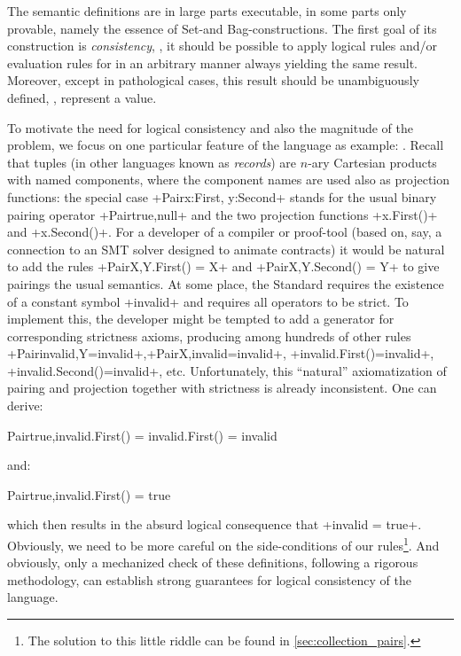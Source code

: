 The semantic definitions are in large parts executable, in some parts
only provable, namely the essence of Set-and Bag-constructions. The first goal
of its construction is \emph{consistency}, \ie, it should be possible
to apply logical rules and/or evaluation rules for \OCL in an
arbitrary manner always yielding the same result. Moreover, except in
pathological cases, this result should be unambiguously defined, \ie,
represent a value.

To motivate the need for logical consistency and also the magnitude of
the problem, we focus on one particular feature of the language as
example: . Recall that tuples (in other languages
known as \emph{records}) are $n$-ary Cartesian products with named
components, where the component names are used also as projection
functions: the special case %
\inlineocl+Pair{x:First, y:Second}+ stands for the usual binary
pairing operator \inlineocl+Pair{true,null}+ and the two projection
functions \inlineocl+x.First()+ and \inlineocl+x.Second()+. For a
developer of a compiler or proof-tool (based on, say, a connection to
an SMT solver designed to animate \OCL contracts) it would be natural
to add the rules \inlineocl+Pair{X,Y}.First() = X+ and
\inlineocl+Pair{X,Y}.Second() = Y+ to give pairings the usual
semantics. At some place, the \OCL Standard requires the existence of
a constant symbol \inlineocl+invalid+ and requires all operators to be
strict. To implement this, the developer might be tempted to add a
generator for corresponding strictness axioms, producing among
hundreds of other rules
\inlineocl+Pair{invalid,Y}=invalid+,\inlineocl+Pair{X,invalid}=invalid+,
\inlineocl+invalid.First()=invalid+,
\inlineocl+invalid.Second()=invalid+, etc.  Unfortunately, this
``natural'' axiomatization of pairing and projection together with
strictness is already inconsistent. One can derive:
\begin{ocl}
   Pair{true,invalid}.First() = invalid.First() = invalid
\end{ocl}
and:
\begin{ocl}
   Pair{true,invalid}.First() = true
\end{ocl}
which then results in the absurd logical consequence that
\inlineocl+invalid = true+. Obviously, we need to be more careful on
the side-conditions of our rules\footnote{The solution to this little
  riddle can be found in \autoref{sec:collection_pairs}.}. And
obviously, only a mechanized check of these definitions, following a
rigorous methodology, can establish strong guarantees for logical
consistency of the \OCL language.

